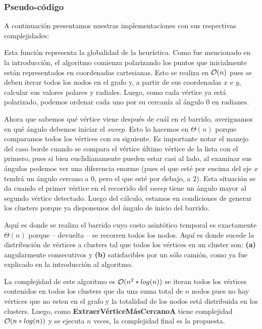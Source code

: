 \subsubsection{Pseudo-código}
A continuación presentamos nuestras implementaciones con sus respectivas complejidades:


Esta función representa la globalidad de la heurística. Como fue mencionado en la introducción, el algoritmo comienza polarizando los puntos que inicialmente están representados en coordenadas cartesianas. Esto se realiza en $\mathcal{O}(n)$ pues se deben iterar todos los nodos en el grafo y, a partir de sus coordenadas $x$ e $y$, calcular sus valores polares y radiales. Luego, como cada vértice ya está polarizado, podemos ordenar cada uno por su cercanía al ángulo $0$ en radianes.


Ahora que sabemos qué vértice viene después de cuál en el barrido, averiguamos en qué ángulo debemos iniciar el \textit{sweep}. Esto lo hacemos en $\Theta(n)$ porque comparamos todos los vértices con su siguiente. Es importante notar el manejo del caso borde cuando se compara el vértice último vértice de la lista con el primero, pues si bien euclidianamente pueden estar casi al lado, al examinar sus ángulos podemos ver una diferencia enorme (pues el que esté por encima del eje $x$ tendrá un ángulo cercano a $0$, pero el que esté por debajo, a $2$). Esta situación se da cuando el primer vértice en el recorrido del \textit{sweep} tiene un ángulo mayor al segundo vértice detectado. Luego del cálculo, estamos en condiciones de generar los clusters porque ya disponemos del ángulo de inicio del barrido.


Aquí es donde se realiza el barrido cuyo costo asintótico temporal es exactamente $\Theta(n)$ porque – devuelta – se recorren todos los nodos. Aquí es donde sucede la distribución de vértices a clusters tal que todos los vértices en un cluster son: \textbf{(a)} angularmente consecutivos y \textbf{(b)} satisfacibles por un sólo camión, como ya fue explicado en la introducción al algoritmo.


La complejidad de este algoritmo es $\mathcal{O}(n^2*log(n))$ se iteran todos los vértices contenidos en todos los clusters que da una suma total de $n$ nodos pues no hay vértices que no esten en el grafo y la totalidad de los nodos está distribuida en los clusters. Luego, como \textbf{ExtraerVérticeMásCercanoA} tiene complejidad $\mathcal{O}(n*log(n))$ y se ejecuta $n$ veces, la complejidad final es la propuesta.

